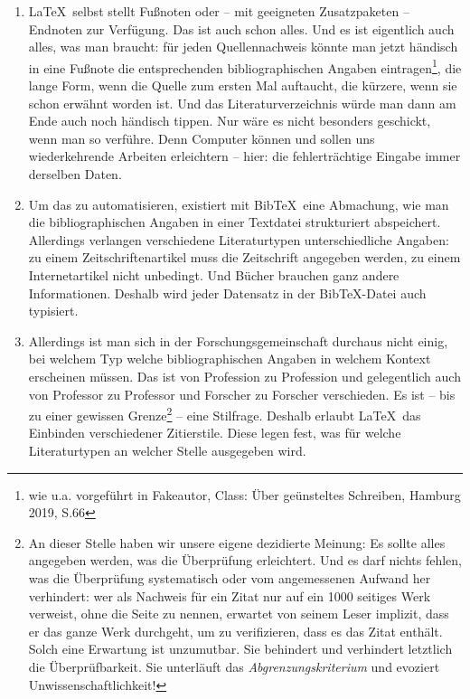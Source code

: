 \begin{enumerate}
  \item \LaTeX\ selbst stellt Fußnoten oder -- mit geeigneten Zusatzpaketen --
  Endnoten zur Verfügung. Das ist auch schon alles. Und es ist eigentlich auch
  alles, was man braucht: für jeden Quellennachweis könnte man jetzt händisch in
  eine Fußnote die entsprechenden bibliographischen Angaben
  eintragen\footnote{wie u.a. vorgeführt in Fakeautor, Class: Über geünsteltes
  Schreiben, Hamburg 2019, S.66}, die lange Form, wenn die Quelle zum ersten Mal
  auftaucht, die kürzere, wenn sie schon erwähnt worden ist. Und das
  Literaturverzeichnis würde man dann am Ende auch noch händisch tippen. Nur wäre es nicht
  besonders geschickt, wenn man so verführe. Denn Computer können und sollen uns
  wiederkehrende Arbeiten erleichtern -- hier: die fehlerträchtige Eingabe immer
  derselben Daten.
  \item Um das zu automatisieren, existiert mit Bib\TeX\ eine Abmachung, wie man
  die bibliographischen Angaben in einer Textdatei strukturiert abspeichert.
  Allerdings verlangen verschiedene Literaturtypen unterschiedliche Angaben: zu
  einem Zeitschriftenartikel muss die Zeitschrift angegeben werden, zu einem
  Internetartikel nicht unbedingt. Und Bücher brauchen ganz andere
  Informationen. Deshalb wird jeder Datensatz in der Bib\TeX-Datei auch
  typisiert.
  \item Allerdings ist man sich in der Forschungsgemeinschaft durchaus nicht
  einig, bei welchem Typ welche bibliographischen Angaben in welchem Kontext
  erscheinen müssen. Das ist von Profession zu Profession und gelegentlich auch
  von Professor zu Professor und Forscher zu Forscher verschieden. Es ist -- bis
  zu einer gewissen Grenze\footnote{An dieser Stelle haben wir unsere eigene
  dezidierte Meinung: Es sollte alles angegeben werden, was die Überprüfung
  erleichtert. Und es darf nichts fehlen, was die Überprüfung systematisch oder
  vom angemessenen Aufwand her verhindert: wer als Nachweis für ein Zitat nur
  auf ein 1000 seitiges Werk verweist, ohne die Seite zu nennen, erwartet von
  seinem Leser implizit, dass er das ganze Werk durchgeht, um zu verifizieren,
  dass es das Zitat enthält. Solch eine Erwartung ist unzumutbar. Sie behindert
  und verhindert letztlich die Überprüfbarkeit. Sie unterläuft das
  \emph{Abgrenzungskriterium} und evoziert Unwissenschaftlichkeit!} -- eine
  Stilfrage. Deshalb erlaubt \LaTeX\ das Einbinden verschiedener Zitierstile.
  Diese legen fest, was für welche Literaturtypen an welcher Stelle ausgegeben
  wird.
\end{enumerate}

